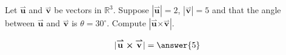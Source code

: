 \documentclass{ximera}
\author{Gregory Hartman \and Matthew Carr}
\begin{document}
\begin{exercise}

Let $\overset{\boldsymbol{\rightharpoonup}}{\mathbf{u}}$ and $\overset{\boldsymbol{\rightharpoonup}}{\mathbf{v}}$ be vectors in $\mathbb{R}^3$. Suppose $|\overset{\boldsymbol{\rightharpoonup}}{\mathbf{u}}|=2$, $|\overset{\boldsymbol{\rightharpoonup}}{\mathbf{v}}|=5$ and that the angle between $\overset{\boldsymbol{\rightharpoonup}}{\mathbf{u}}$ and $\overset{\boldsymbol{\rightharpoonup}}{\mathbf{v}}$ is $\theta=30^{\circ}$. Compute $|\overset{\boldsymbol{\rightharpoonup}}{\mathbf{u}} \boldsymbol\times \overset{\boldsymbol{\rightharpoonup}}{\mathbf{v}}|$.

\begin{prompt}
\[
|\overset{\boldsymbol{\rightharpoonup}}{\mathbf{u}} \boldsymbol\times \overset{\boldsymbol{\rightharpoonup}}{\mathbf{v}}|=\answer{5}
\]
\end{prompt}


\end{exercise}
\end{document}
